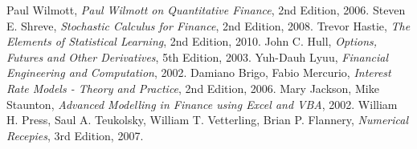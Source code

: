 \documentclass[11pt]{article} %
\begin{document}
\begin{thebibliography}{9}
 Paul Wilmott, \emph{Paul Wilmott on Quantitative Finance}, 2nd Edition, 2006.
 Steven E. Shreve, \emph{Stochastic Calculus for Finance}, 2nd Edition, 2008.
 Trevor Hastie, \emph{The Elements of Statistical Learning}, 2nd Edition, 2010.
 John C. Hull, \emph{Options, Futures and Other Derivatives}, 5th Edition, 2003.
 Yuh-Dauh Lyuu, \emph{Financial Engineering and Computation}, 2002.
 Damiano Brigo, Fabio Mercurio, \emph{Interest Rate Models - Theory and Practice}, 2nd Edition, 2006.
 Mary Jackson, Mike Staunton, \emph{Advanced Modelling in Finance using Excel and VBA}, 2002.
 William H. Press, Saul A. Teukolsky, William T. Vetterling, Brian P. Flannery,  \emph{Numerical Recepies}, 3rd Edition, 2007.
\end{thebibliography}
\end{document}
